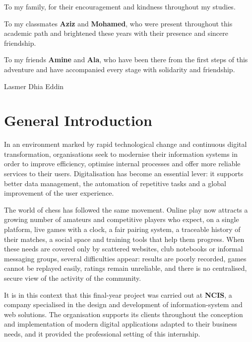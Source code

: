 \documentclass[12pt,a4paper,oneside]{report}
\newcommand{\StudentName}{Lasmer Dhia Eddin}
\begin{document}
To my family, for their encouragement and kindness throughout my studies.

To my classmates \textbf{Aziz} and \textbf{Mohamed}, who were present throughout this academic path and brightened these years with their presence and sincere friendship.

To my friends \textbf{Amine} and \textbf{Ala}, who have been there from the first steps of this adventure and have accompanied every stage with solidarity and friendship.

\vspace{1.8cm}
\hfill \StudentName

\clearpage
\tableofcontents
\clearpage
{}
{}
\listoffigures
\clearpage
{}
{}
\listoftables
\clearpage

\chapter*{General Introduction}

In an environment marked by rapid technological change and continuous digital transformation, organisations seek to modernise their information systems in order to improve efficiency, optimise internal processes and offer more reliable services to their users. Digitalisation has become an essential lever: it supports better data management, the automation of repetitive tasks and a global improvement of the user experience.

The world of chess has followed the same movement. Online play now attracts a growing number of amateurs and competitive players who expect, on a single platform, live games with a clock, a fair pairing system, a traceable history of their matches, a social space and training tools that help them progress. When these needs are covered only by scattered websites, club notebooks or informal messaging groups, several difficulties appear: results are poorly recorded, games cannot be replayed easily, ratings remain unreliable, and there is no centralised, secure view of the activity of the community.

It is in this context that this final-year project was carried out at \textbf{NCIS}, a company specialised in the design and development of information-system and web solutions. The organisation supports its clients throughout the conception and implementation of modern digital applications adapted to their business needs, and it provided the professional setting of this internship.
\end{document}
